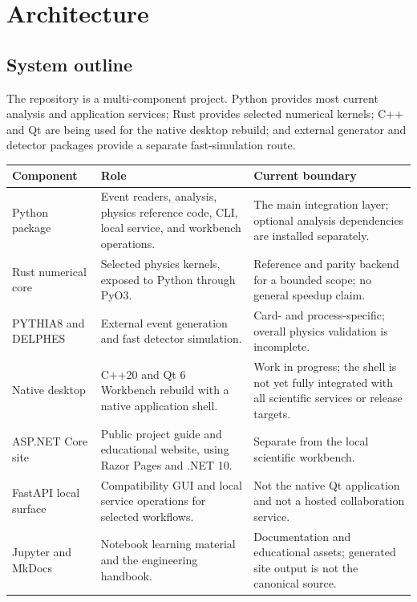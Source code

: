 \documentclass[11pt,a4paper]{article}
\begin{document}
\section{Architecture}

\subsection{System outline}

The repository is a multi-component project. Python provides most current
analysis and application services; Rust provides selected numerical kernels;
C++ and Qt are being used for the native desktop rebuild; and external
generator and detector packages provide a separate fast-simulation route.

\begin{center}
\small
\setlength{\tabcolsep}{5pt}
\begin{tabularx}{\textwidth}{P{0.24\textwidth} Y Y}
\toprule
\textbf{Component} & \textbf{Role} & \textbf{Current boundary} \\
\midrule
Python package &
Event readers, analysis, physics reference code, CLI, local service, and
workbench operations. &
The main integration layer; optional analysis dependencies are installed
separately. \\
Rust numerical core &
Selected physics kernels, exposed to Python through PyO3. &
Reference and parity backend for a bounded scope; no general speedup claim. \\
PYTHIA8 and DELPHES &
External event generation and fast detector simulation. &
Card- and process-specific; overall physics validation is incomplete. \\
Native desktop &
C++20 and Qt 6 Workbench rebuild with a native application shell. &
Work in progress; the shell is not yet fully integrated with all scientific
services or release targets. \\
ASP.NET Core site &
Public project guide and educational website, using Razor Pages and .NET 10. &
Separate from the local scientific workbench. \\
FastAPI local surface &
Compatibility GUI and local service operations for selected workflows. &
Not the native Qt application and not a hosted collaboration service. \\
Jupyter and MkDocs &
Notebook learning material and the engineering handbook. &
Documentation and educational assets; generated site output is not the
canonical source. \\
\bottomrule
\end{tabularx}
\end{center}
\end{document}
